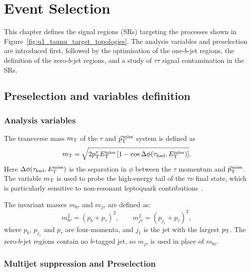 \chapter{Event Selection}
\label{chapter:event_selection}

This chapter defines the signal regions (SRs) targeting the processes shown in Figure~\ref{fig:u1_taunu_target_topologies}.
The analysis variables and preselection are introduced first, followed by the optimisation of the one-$b$-jet regions, the definition of the zero-$b$-jet regions, and a study of $\tau\tau$ signal contamination in the SRs.

\section{Preselection and variables definition}
\label{sec:ch7_preselection}

\subsection{Analysis variables}
\label{subsec:ch7_variables}

The transverse mass $m_{\mathrm{T}}$ of the $\tau$ and $\vec p_{\mathrm{T}}^{\,\mathrm{miss}}$ system is defined as
    \begin{equation}
        m_{\mathrm{T}} = \sqrt{2p_{\mathrm{T}}^\tau E_{\mathrm{T}}^{\mathrm{miss}}\left[1-\cos\Delta\phi(\tau_{\mathrm{had}}, E_{\mathrm{T}}^{\mathrm{miss}})\right]}.
        \label{eq:ch7_mt}
    \end{equation}
Here $\Delta\phi(\tau_{\mathrm{had}}, E_{\mathrm{T}}^{\mathrm{miss}})$ is the separation in $\phi$ between the $\tau$ momentum and $\vec p_{\mathrm{T}}^{\,\mathrm{miss}}$.
The variable $m_{\mathrm{T}}$ is used to probe the high-energy tail of the $\tau\nu$ final state, which is particularly sensitive to non-resonant leptoquark contributions~\cite{Endo2022NonResonant}.

The invariant masses $m_{b\tau}$ and $m_{j\tau}$ are defined as:
    \begin{equation}
        m_{b\tau}^{2} = (p_b+p_\tau)^2, \qquad m_{j\tau}^{2} = (p_{j_1}+p_\tau)^2,
        \label{eq:ch7_visible_masses}
    \end{equation}
    where $p_b$, $p_{j_1}$ and $p_\tau$ are four-momenta, and $j_1$ is the jet with the largest $p_{\mathrm{T}}$.
The zero-$b$-jet regions contain no $b$-tagged jet, so $m_{j\tau}$ is used in place of $m_{b\tau}$.

\subsection{Multijet suppression and Preselection}
\label{subsec:ch7_multijet}

